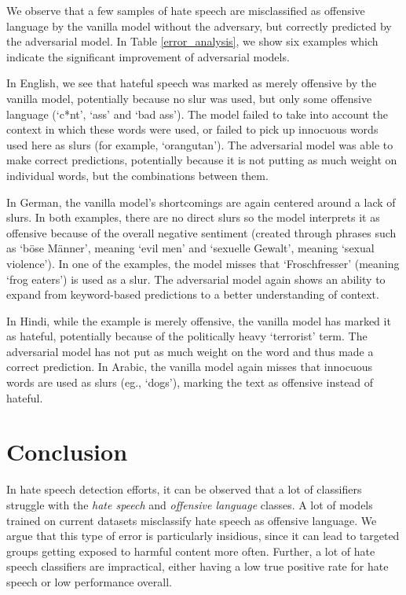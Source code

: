 \documentclass[11pt]{article}
\begin{document}
	We observe that a few samples of hate speech are misclassified as offensive language by the vanilla model without the adversary, but correctly predicted by the adversarial model. In Table \ref{error_analysis}, we show six examples which indicate the significant improvement of adversarial models.
	
	In English, we see that hateful speech was marked as merely offensive by the vanilla model, potentially because no slur was used, but only some offensive language (`c*nt', `ass' and `bad ass'). The model failed to take into account the context in which these words were used, or failed to pick up innocuous words used here as slurs (for example, `orangutan'). The adversarial model was able to make correct predictions, potentially because it is not putting as much weight on individual words, but the combinations between them.
	
	In German, the vanilla model's shortcomings are again centered around a lack of slurs. In both examples, there are no direct slurs so the model interprets it as offensive because of the overall negative sentiment (created through phrases such as `böse Männer', meaning `evil men' and `sexuelle Gewalt', meaning `sexual violence'). In one of the examples, the model misses that `Froschfresser' (meaning `frog eaters') is used as a slur. The adversarial model again shows an ability to expand from keyword-based predictions to a better understanding of context.
	
	In Hindi, while the example is merely offensive, the vanilla model has marked it as hateful, potentially because of the politically heavy `terrorist' term. The adversarial model has not put as much weight on the word and thus made a correct prediction. In Arabic, the vanilla model again misses that innocuous words are used as slurs (eg., `dogs'), marking the text as offensive instead of hateful.
	
	
	\section{Conclusion}
	
	In hate speech detection efforts, it can be observed that a lot of classifiers struggle with the \textit{hate speech} and \textit{offensive language} classes. A lot of models trained on current datasets misclassify hate speech as offensive language. We argue that this type of error is particularly insidious, since it can lead to targeted groups getting exposed to harmful content more often. Further, a lot of hate speech classifiers are impractical, either having a low true positive rate for hate speech or low performance overall.
	
\end{document}
